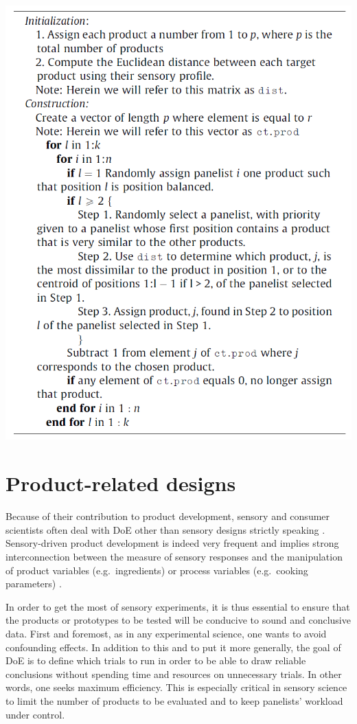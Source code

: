 \documentclass[
]{krantz}
\begin{document}
\begin{center}\includegraphics[width=0.9\linewidth]{images/sensory_doe} \end{center}

\hypertarget{product-related-designs}{%
\section{Product-related designs}\label{product-related-designs}}

Because of their contribution to product development, sensory and consumer scientists often deal with DoE other than sensory designs strictly speaking \citep[see for instance][]{gacula2008design}. Sensory-driven product development is indeed very frequent and implies strong interconnection between the measure of sensory responses and the manipulation of product variables (e.g.~ingredients) or process variables (e.g.~cooking parameters) \citep[for a review, see][]{Yu2018}.

In order to get the most of sensory experiments, it is thus essential to ensure that the products or prototypes to be tested will be conducive to sound and conclusive data. First and foremost, as in any experimental science, one wants to avoid confounding effects. In addition to this and to put it more generally, the goal of DoE is to define which trials to run in order to be able to draw reliable conclusions without spending time and resources on unnecessary trials. In other words, one seeks maximum efficiency. This is especially critical in sensory science to limit the number of products to be evaluated and to keep panelists' workload under control.
\end{document}
